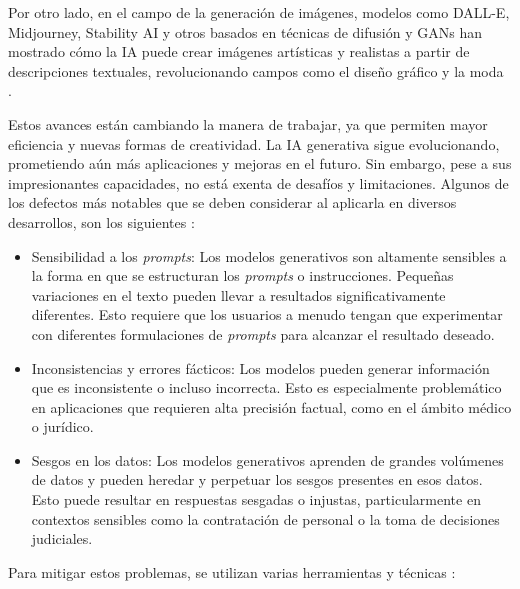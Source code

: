 Por otro lado, en el campo de la generación de imágenes, modelos como DALL-E, Midjourney, Stability AI y otros basados en técnicas de difusión y GANs han mostrado cómo la IA puede crear imágenes artísticas y realistas a partir de descripciones textuales, revolucionando campos como el diseño gráfico y la moda \citep{BattleOfCreativity2024}.



Estos avances están cambiando la manera de trabajar, ya que permiten mayor eficiencia y nuevas formas de creatividad. La IA generativa sigue evolucionando, prometiendo aún más aplicaciones y mejoras en el futuro. Sin embargo, pese a sus impresionantes capacidades, no está exenta de desafíos y limitaciones. Algunos de los defectos más notables que se deben considerar al aplicarla en diversos desarrollos, son los siguientes \citep{TowardsAI2024}:

\begin{itemize}
    \item Sensibilidad a los \textit{prompts}: Los modelos generativos son altamente sensibles a la forma en que se estructuran los \textit{prompts} o instrucciones. Pequeñas variaciones en el texto pueden llevar a resultados significativamente diferentes. Esto requiere que los usuarios a menudo tengan que experimentar con diferentes formulaciones de \textit{prompts} para alcanzar el resultado deseado.
    \item Inconsistencias y errores fácticos: Los modelos pueden generar información que es inconsistente o incluso incorrecta. Esto es especialmente problemático en aplicaciones que requieren alta precisión factual, como en el ámbito médico o jurídico.
    \item Sesgos en los datos: Los modelos generativos aprenden de grandes volúmenes de datos y pueden heredar y perpetuar los sesgos presentes en esos datos. Esto puede resultar en respuestas sesgadas o injustas, particularmente en contextos sensibles como la contratación de personal o la toma de decisiones judiciales.
\end{itemize}

Para mitigar estos problemas, se utilizan varias herramientas y técnicas  \citep{TowardsAI2024}:

